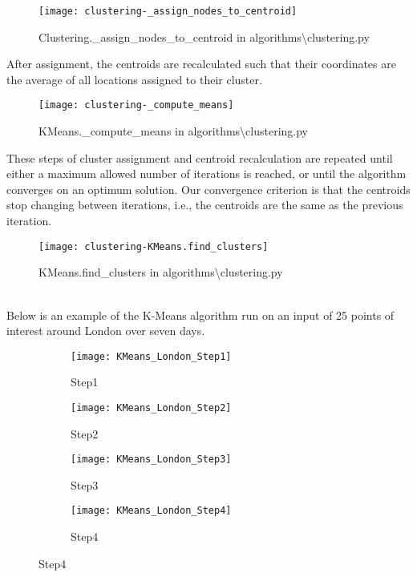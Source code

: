 \begin{figure}[H]\label{fig:_assign_nodes_to_centroid}
    \centering
    \texttt{[image: clustering-\_assign\_nodes\_to\_centroid]}
    \caption{Clustering.\_assign\_nodes\_to\_centroid in algorithms\textbackslash clustering.py}
\end{figure}
\noindent
After assignment, the centroids are recalculated such that their coordinates are the average of all locations
assigned to their cluster.

\begin{figure}[H]\label{fig:_compute_means}
    \centering
    \texttt{[image: clustering-\_compute\_means]}
    \caption{KMeans.\_compute\_means in algorithms\textbackslash clustering.py}
\end{figure}
\noindent
These steps of cluster assignment and centroid recalculation are repeated until either a maximum allowed number of
iterations is reached, or until the algorithm converges on an optimum solution.
Our convergence criterion is that the centroids stop changing between iterations, i.e., the centroids are the same
as the previous iteration.

\begin{figure}[H]\label{fig:find_clusters}
    \centering
    \texttt{[image: clustering-KMeans.find\_clusters]}
    \caption{KMeans.find\_clusters in algorithms\textbackslash clustering.py}
\end{figure}
\\
\noindent
Below is an example of the K-Means algorithm run on an input of 25 points of interest around London over seven days.

\begin{figure}[H]{\textwidth}\label{fig:k-means-example}
    \centering
    \begin{subfigure}[h]{0.49\textwidth}\label{fig:k-means-london-step1}
        \texttt{[image: KMeans\_London\_Step1]}
        \caption{Step1}
    \end{subfigure}
    \begin{subfigure}[h]{0.49\textwidth}\label{fig:k-means-london-step2}
        \texttt{[image: KMeans\_London\_Step2]}
        \caption{Step2}
    \end{subfigure}
    \begin{subfigure}[h]{0.49\textwidth}\label{fig:k-means-london-step3}
        \texttt{[image: KMeans\_London\_Step3]}
        \caption{Step3}
    \end{subfigure}
    \begin{subfigure}[h]{0.49\textwidth}\label{fig:k-means-london-step4}
        \texttt{[image: KMeans\_London\_Step4]}
        \caption{Step4}
    \end{subfigure}
\end{figure}

